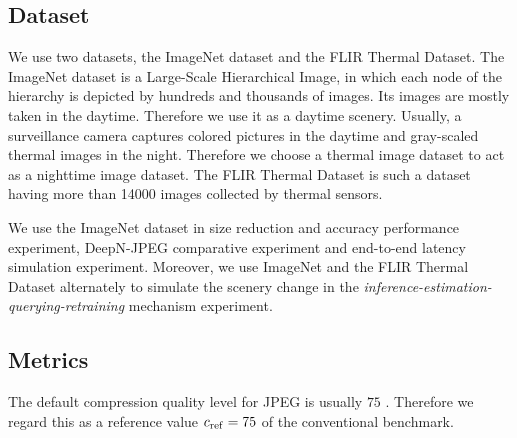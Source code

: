 
\subsection{Dataset}

We use two datasets, the ImageNet dataset and the FLIR Thermal Dataset. The ImageNet dataset is a Large-Scale Hierarchical Image, in which each node of the hierarchy is depicted by hundreds and thousands of images. Its images are mostly taken in the daytime. Therefore we use it as a daytime scenery. Usually, a surveillance camera captures colored pictures in the daytime and gray-scaled thermal images in the night. Therefore we choose a thermal image dataset to act as a nighttime image dataset. The FLIR Thermal Dataset is such a dataset having more than 14000 images collected by thermal sensors.

We use the ImageNet dataset in size reduction and accuracy performance experiment, DeepN-JPEG comparative experiment and end-to-end latency simulation experiment. Moreover, we use ImageNet and the FLIR Thermal Dataset alternately to simulate the scenery change in the \emph{inference-estimation-querying-retraining} mechanism experiment.

\subsection{Metrics}
\label{subsec:metrics}

The default compression quality level for JPEG is usually $75$ \cite{pillow_benchmark,imgmin}. Therefore we regard this as a reference value $ c_{\rm ref} = 75 $ of the conventional benchmark.

